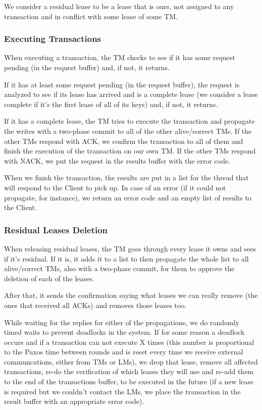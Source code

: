 \documentclass[times, 10pt,twocolumn]{article}
\begin{document}
We consider a residual lease to be a lease that is ours, not assigned to any transaction and in conflict with some lease of some TM.

\subsubsection{Executing Transactions}

When executing a transaction, the TM checks to see if it has some request pending (in the request buffer) and, if not, it returns.

If it has at least some request pending (in the request buffer), the request is analyzed to see if its lease has arrived and is a complete lease (we consider a lease complete if it's the first lease of all of its keys) and, if not, it returns.

If it has a complete lease, the TM tries to execute the transaction and propagate the writes with a two-phase commit to all of the other alive/correct TMs.
If the other TMs respond with ACK, we confirm the transaction to all of them and finish the execution of the transaction on our own TM.
If the other TMs respond with NACK, we put the request in the results buffer with the error code.

When we finish the transaction, the results are put in a list for the thread that will respond to the Client to pick up.
In case of an error (if it could not propagate, for instance), we return an error code and an empty list of results to the Client.

\subsubsection{Residual Leases Deletion}

When releasing residual leases, the TM goes through every lease it owns and sees if it's residual.
If it is, it adds it to a list to then propagate the whole list to all alive/correct TMs, also with a two-phase commit, for them to approve the deletion of each of the leases.

After that, it sends the confirmation saying what leases we can really remove (the ones that received all ACKs) and removes those leases too.

While waiting for the replies for either of the propagations, we do randomly timed waits to prevent deadlocks in the system.
If for some reason a deadlock occurs and if a transaction can not execute X times (this number is proportional to the Paxos time between rounds and is reset every time we receive external communcations, either from TMs or LMs), we drop that lease, remove all affected transactions, re-do the verification of which leases they will use and re-add them to the end of the transactions buffer, to be executed in the future (if a new lease is required but we couldn't contact the LMs, we place the transaction in the result buffer with an appropriate error code).
\end{document}
